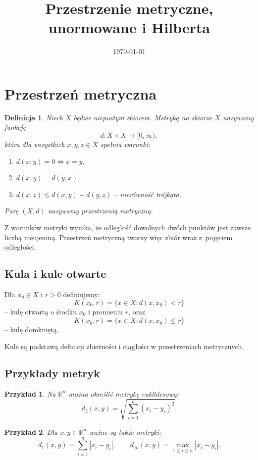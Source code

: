 \documentclass{article}
\title{Przestrzenie metryczne, unormowane i Hilberta}
\date{\today}
\newtheorem{definicja}{Definicja}
\newtheorem{przyklad}{Przykład}
\begin{document}
\maketitle

\section{Przestrzeń metryczna}

\begin{definicja}
Niech $X$ będzie niepustym zbiorem. Metryką na zbiorze $X$ nazywamy funkcję
\[
d:X\times X\rightarrow[0,\infty),
\]
która dla wszystkich $x,y,z\in X$ spełnia warunki:
\begin{enumerate}[label=(M\arabic*)]
    \item $d(x,y)=0 \iff x=y$,
    \item $d(x,y)=d(y,x)$,
    \item $d(x,z)\leq d(x,y)+d(y,z)$ -- nierówność trójkąta.
\end{enumerate}
Parę $(X,d)$ nazywamy przestrzenią metryczną.
\end{definicja}

Z warunków metryki wynika, że odległość dowolnych dwóch punktów jest zawsze liczbą nieujemną. Przestrzeń metryczną tworzy więc zbiór wraz z~pojęciem odległości.

\subsection{Kula i kule otwarte}
Dla $x_0\in X$ i $r>0$ definiujemy:
\[
K(x_0,r)=\{x\in X:d(x,x_0)<r\}
\]
-- kulę otwartą o środku $x_0$ i promieniu $r$, oraz
\[
\overline{K}(x_0,r)=\{x\in X:d(x,x_0)\leq r\}
\]
-- kulę domkniętą.

Kule są podstawą definicji zbieżności i ciągłości w przestrzeniach metrycznych.

\subsection{Przykłady metryk}
\begin{przyklad}
Na $\mathbb R^n$ można określić metrykę euklidesową:
\[
d_2(x,y)=\sqrt{\sum_{i=1}^{n}(x_i-y_i)^2}.
\]
\end{przyklad}

\begin{przyklad}
Dla $x,y\in\mathbb R^n$ ważne są także metryki:
\[
d_1(x,y)=\sum_{i=1}^{n}|x_i-y_i|,
\qquad
d_\infty(x,y)=\max_{1\leq i\leq n}|x_i-y_i|.
\]
\end{przyklad}
\end{document}
